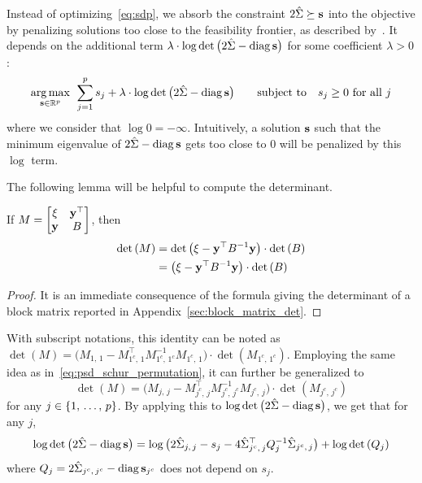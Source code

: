 Instead of optimizing~\ref{eq:sdp},
we absorb the constraint $2\hat{\Sigma} \succeq \mathbf{s}$ into the objective by penalizing solutions
too close to the feasibility frontier, as described by~\citet[§11.3]{convex_optimization}.
It depends on the additional term
$\lambda \cdot \log\det\big( 2\hat{\Sigma} - \operatorname*{diag}\mathbf{s} \big)$
for some coefficient $\lambda > 0$:
\begin{equation}\label{eq:sdp_log_barrier}
    \underset{\mathbf{s} \in \mathbb{R}^p}{\operatorname*{arg\,max}}\;\,
    \sum_{j = 1}^p s_j
    + \lambda \cdot \log\det\big( 2\hat{\Sigma} - \operatorname*{diag}\mathbf{s} \big)
    \qquad
    \text{subject to}\quad
    s_j \geq 0\text{ for all } j
\end{equation}
where we consider that $\log 0 = -\infty$.
Intuitively, a solution $\mathbf{s}$ such that the minimum eigenvalue of $2\hat{\Sigma} - \operatorname*{diag}\mathbf{s}$ gets too close to $0$
will be penalized by this $\log$ term.

\bigbreak
The following lemma will be helpful to compute the determinant.
\begin{lemma}
    If $M = \begin{bmatrix}
        \xi & \mathbf{y}^\top\\
        \mathbf{y} & B
    \end{bmatrix}$,
    then
    \begin{align*}
        \det\left( M \right) &= \det\big( \xi - \mathbf{y}^\top B^{-1} \mathbf{y} \big) \cdot \det\left( B \right)\\
        &= \big( \xi - \mathbf{y}^\top B^{-1} \mathbf{y} \big) \cdot \det\left( B \right)
    \end{align*}
\end{lemma}
\begin{proof}
    It is an immediate consequence of the formula giving the determinant of a block matrix
    reported in Appendix~\ref{sec:block_matrix_det}.
\end{proof}
With subscript notations, this identity can be noted as
$\det\left( M \right) = \big( M_{1,\, 1} - M_{1^c,\, 1}^\top M_{1^c,\, 1^c}^{-1} M_{1^c,\, 1} \big)
    \cdot\det\left( M_{1^c,\, 1^c} \right)$.
Employing the same idea as in~\ref{eq:psd_schur_permutation},
it can further be generalized to
\begin{equation*}
    \det\left( M \right) = \big( M_{j,\, j} - M_{j^c,\, j}^\top M_{j^c,\, j^c}^{-1} M_{j^c,\, j} \big)
        \cdot\det\left( M_{j^c,\, j^c} \right)
\end{equation*}
for any $j \in \left\{ 1,\, \dots,\, p \right\}$.
By applying this to $\log\det\big( 2\hat{\Sigma} - \operatorname*{diag}\mathbf{s} \big)$,
we get that for any $j$,
\begin{equation*}
    \log\det\big( 2\hat{\Sigma} - \operatorname*{diag}\mathbf{s} \big) =
        \log\big( 2\hat{\Sigma}_{j,\, j} - s_j - 4\hat{\Sigma}_{j^c,\, j}^\top Q_j^{-1} \hat{\Sigma}_{j^c,\, j} \big)
            + \log\det\left( Q_j \right)
\end{equation*}
where $Q_j = 2\hat{\Sigma}_{j^c,\, j^c} - \operatorname*{diag}\mathbf{s}_{j^c}$ does not depend on $s_j$.

